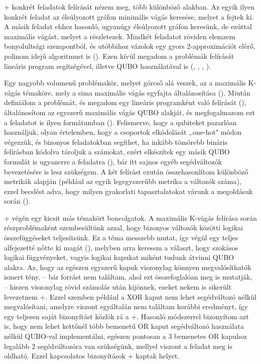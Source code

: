  
\Az+ konkrét feladatok felírását nézem meg, több különböző alakban. 
Az egyik ilyen konkrét feladat az élsúlyozott gráfon minimális vágás keresése, melyet a  fejtek ki.
A másik feladat ehhez hasonló, ugyanúgy élsúlyozott gráfon keresünk, de ezúttal maximális vágást, melyet a  részletezek. Mindkét feladatot röviden elemzem bonyolultsági szempontból, és utóbbihoz vázolok egy gyors 2-approximációt elérő, polinom idejű algoritmust is ().
Ezen kívül megadom a problémák felírását lineáris program segítségével, illetve QUBO használatával is (, , , ).

Egy nagyobb volumenű problémakör, melyet górcső alá veszek, az a maximális K-vágás témaköre, mely a sima maximális vágás egyfajta általánosítása (). Miután definiálom a problémát, és megadom egy lineáris programként való felírását (), általánosítom az egyszerű maximális vágás QUBO alakját, és megfogalmazom ezt a feladatot is ilyen formátumban (). Felismerve, hogy a qubiteket pazarlóan használjuk, olyan értelemben, hogy a csoportok elkódolását ,,one-hot" módon végezzük, és bizonyos feladatokban segíthet, ha inkább tömörebb bináris felírásban kódolva tároljuk a számokat, ezért elkészítek egy másik QUBO formulát is ugyanerre a feladatra (), bár itt sajnos egyéb segédváltozók bevezetésére is lesz szükségem. A két felírást ezután összehasonlítom különböző metrikák alapján (például az egyik legegyszerűbb metrika a változók száma), ezzel becslést adva, hogy milyen gyakorlati tapasztalatokat várunk a megoldásuk során ().

\Az+ végén egy kicsit más témakört boncolgatok. A maximális K-vágás felírása során részproblémaként szembesültünk azzal, hogy bizonyos változók közötti logikai összefüggéseket teljesítsünk. Ez a téma messzebb mutat, így végül egy teljes alfejezetté nőtte ki magát (), melyben arra keresem a választ, hogy szokásos logikai függvényeket, vagyis logikai kapukat miként tudunk átvinni QUBO alakra. Az, hogy az egészen egyszerű kapuk viszonylag könnyen megvalósíthatók ismert tény, -- bár forrást nem találtam, ahol ezt összefoglalóan meg is mutatják, -- hiszen viszonylag rövid számolás után kijönnek, ezeket nekem is sikerült levezetnem \az+. Ezzel szemben például a XOR kaput nem lehet segédváltozó nélkül megvalósítani, amelyre viszont egyáltalán nem találtam korábbi eredményt, így egy teljesen saját bizonyítást közlök rá a \az+. Hasonló módszerrel bizonyítom azt is, hogy nem lehet kettőnél több bemenetű OR kaput segédváltozó használata nélkül QUBO-val implementálni, egészen pontosan a 3 bemenetes OR kapuhoz legalább 2 segédváltozóra van szükségünk, mellyel viszont a feladat meg is oldható. Ezzel kapcsolatos bizonyítások \az+ kaptak helyet.

